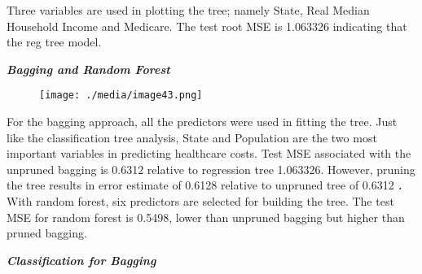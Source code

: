 \documentclass[12pt]{article}
\begin{document}

\par


\vspace{\baselineskip}
\begin{justify}
Three variables are used in plotting the tree; namely State, Real Median Household Income and Medicare. The test root MSE is 1.063326 indicating that the reg tree model.
\end{justify}\par

\begin{justify}
\textbf{\textit{Bagging and Random Forest}}
\end{justify}\par




\begin{figure}[H]
	\begin{Center}
		\texttt{[image: ./media/image43.png]}
	\end{Center}
\end{figure}



\par

\begin{justify}
For the bagging approach, all the predictors were used in fitting the tree. Just like the classification tree analysis, State and Population are the two most important variables in predicting healthcare costs. Test MSE associated with the unpruned bagging is 0.6312 relative to regression tree 1.063326. However, pruning the tree results in error estimate of 0.6128 relative to unpruned tree of 0.6312\textbf{\textit{ . }}With random forest, six predictors are selected for building the tree. The test MSE for random forest is 0.5498, lower than unpruned bagging but higher than pruned bagging.
\end{justify}\par

\begin{justify}
\textbf{\textit{Classification for Bagging}}
\end{justify}\par
\end{document}
